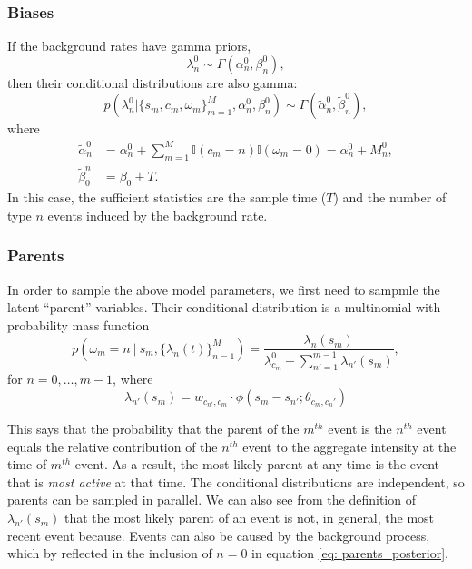 		\subsubsection*{Biases}
			If the background rates have gamma priors,
			\begin{equation}
				\lambda_n^{0} \sim \Gamma(\alpha_n^0, \beta_n^0),
			\end{equation}
			then their conditional distributions are also gamma:
			\begin{equation}
				p(\lambda_n^{0} | \{s_m, c_m, \omega_m\}_{m=1}^M, \alpha_n^0, \beta_n^0) \sim \Gamma(\tilde{\alpha}_n^0, \tilde{\beta}_n^0),
			\end{equation}
			where
			\begin{align}
				\tilde{\alpha}_n^0 &= \alpha_n^0 + \sum_{m=1}^M \mathbb{I}(c_m=n) \mathbb{I}(\omega_m=0) = \alpha_n^0 + M_n^0, \\
				\tilde{\beta}_0^n &= \beta_0 + T.
			\end{align}
			In this case, the sufficient statistics are the sample time ($T$) and the number of type $n$ events induced by the background rate.

		\subsubsection*{Parents}
			In order to sample the above model parameters, we first need to sampmle the latent ``parent'' variables. Their conditional distribution is a multinomial with probability mass function
			\begin{equation} \label{eq: parents_posterior}
				p(\omega_m = n \ | \ s_m, \{ \lambda_n(t)\}_{n=1}^M) = \frac{\lambda_n(s_m)}{\lambda_{c_m}^0 + \sum_{n'=1}^{m - 1} \lambda_{n'}(s_m)},
			\end{equation}
			for $n = 0, \dots, m - 1$, where
			\begin{equation}
				\lambda_{n'}(s_m) = w_{c_{n'},c_m} \cdot \phi(s_m - s_{n'}; \theta_{c_m,c_n'})
			\end{equation}

			This says that the probability that the parent of the $m^{th}$ event is the $n^{th}$ event equals the relative contribution of the $n^{th}$ event to the aggregate intensity at the time of $m^{th}$ event. As a result, the most likely parent at any time is the event that is \textit{most active} at that time. The conditional distributions are independent, so parents can be sampled in parallel. We can also see from the definition of $\lambda_{n'}(s_m)$ that the most likely parent of an event is not, in general, the most recent event because. Events can also be caused by the background process, which by reflected in the inclusion of $n=0$ in equation \eqref{eq: parents_posterior}.


